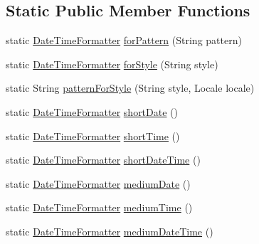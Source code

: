 \subsection*{Static Public Member Functions}
\begin{DoxyCompactItemize}
\item 
static \hyperlink{classorg_1_1joda_1_1time_1_1format_1_1_date_time_formatter}{Date\-Time\-Formatter} \hyperlink{classorg_1_1joda_1_1time_1_1format_1_1_date_time_format_a89cdac18d2f89035aeba6db480d5957a}{for\-Pattern} (String pattern)
\item 
static \hyperlink{classorg_1_1joda_1_1time_1_1format_1_1_date_time_formatter}{Date\-Time\-Formatter} \hyperlink{classorg_1_1joda_1_1time_1_1format_1_1_date_time_format_a85cf0faa2f6a8fca06fb6987f6e286d2}{for\-Style} (String style)
\item 
static String \hyperlink{classorg_1_1joda_1_1time_1_1format_1_1_date_time_format_ae4fb98ba779f0da837ea6c598f63f352}{pattern\-For\-Style} (String style, Locale locale)
\item 
static \hyperlink{classorg_1_1joda_1_1time_1_1format_1_1_date_time_formatter}{Date\-Time\-Formatter} \hyperlink{classorg_1_1joda_1_1time_1_1format_1_1_date_time_format_aea427f3b800369db20062be5dc251d91}{short\-Date} ()
\item 
static \hyperlink{classorg_1_1joda_1_1time_1_1format_1_1_date_time_formatter}{Date\-Time\-Formatter} \hyperlink{classorg_1_1joda_1_1time_1_1format_1_1_date_time_format_a1f6a353657f01619c5efc23dc05fbb73}{short\-Time} ()
\item 
static \hyperlink{classorg_1_1joda_1_1time_1_1format_1_1_date_time_formatter}{Date\-Time\-Formatter} \hyperlink{classorg_1_1joda_1_1time_1_1format_1_1_date_time_format_ada7a51db1a097f9be4d2991020ec13ec}{short\-Date\-Time} ()
\item 
static \hyperlink{classorg_1_1joda_1_1time_1_1format_1_1_date_time_formatter}{Date\-Time\-Formatter} \hyperlink{classorg_1_1joda_1_1time_1_1format_1_1_date_time_format_af445528226c109e10cc7f2e907b1214c}{medium\-Date} ()
\item 
static \hyperlink{classorg_1_1joda_1_1time_1_1format_1_1_date_time_formatter}{Date\-Time\-Formatter} \hyperlink{classorg_1_1joda_1_1time_1_1format_1_1_date_time_format_a7b73f436fe29b4bfd3216777687de250}{medium\-Time} ()
\item 
static \hyperlink{classorg_1_1joda_1_1time_1_1format_1_1_date_time_formatter}{Date\-Time\-Formatter} \hyperlink{classorg_1_1joda_1_1time_1_1format_1_1_date_time_format_a30312dff8844d6d686b9b0689305f371}{medium\-Date\-Time} ()

\end{DoxyCompactItemize}
